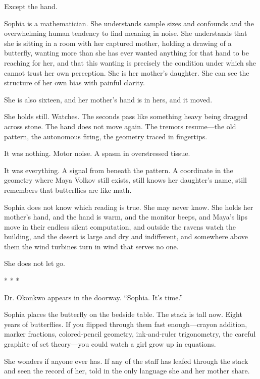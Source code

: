Except the hand.

Sophia is a mathematician. She understands sample sizes and confounds and the overwhelming human tendency to find meaning in noise. She understands that she is sitting in a room with her captured mother, holding a drawing of a butterfly, wanting more than she has ever wanted anything for that hand to be reaching for her, and that this wanting is precisely the condition under which she cannot trust her own perception. She is her mother's daughter. She can see the structure of her own bias with painful clarity.

She is also sixteen, and her mother's hand is in hers, and it moved.

She holds still. Watches. The seconds pass like something heavy being dragged across stone. The hand does not move again. The tremors resume---the old pattern, the autonomous firing, the geometry traced in fingertips.

It was nothing. Motor noise. A spasm in overstressed tissue.

It was everything. A signal from beneath the pattern. A coordinate in the geometry where Maya Volkov still exists, still knows her daughter's name, still remembers that butterflies are like math.

Sophia does not know which reading is true. She may never know. She holds her mother's hand, and the hand is warm, and the monitor beeps, and Maya's lips move in their endless silent computation, and outside the ravens watch the building, and the desert is large and dry and indifferent, and somewhere above them the wind turbines turn in wind that serves no one.

She does not let go.

\begin{center}
* * *
\end{center}

Dr. Okonkwo appears in the doorway. ``Sophia. It's time.''

Sophia places the butterfly on the bedside table. The stack is tall now. Eight years of butterflies. If you flipped through them fast enough---crayon addition, marker fractions, colored-pencil geometry, ink-and-ruler trigonometry, the careful graphite of set theory---you could watch a girl grow up in equations.

She wonders if anyone ever has. If any of the staff has leafed through the stack and seen the record of her, told in the only language she and her mother share.

